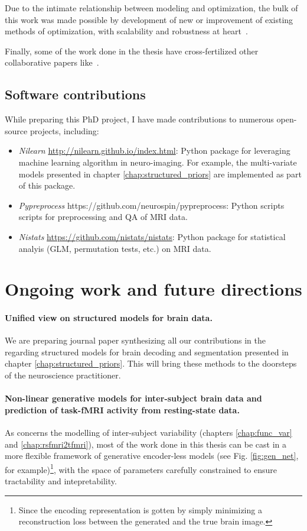 Due to the intimate relationship between modeling and optimization, the
bulk of this work was made possible by development of new or improvement of existing methods of
optimization, with scalability and robustness at heart~\citep{dohmatob2014benchmarking,dohmatob2015local,varoquaux2015faasta,dohmatob2015simple}.

Finally, some of the work done in the thesis have cross-fertilized other collaborative papers like~\citep{rahim2015integrating,thirion2014fmri}.

\subsection{Software contributions}
While preparing this PhD project, I have made contributions to numerous open-source projects, including:
\begin{itemize}
\item \textit{Nilearn} \url{http://nilearn.github.io/index.html}: Python package for leveraging machine learning algorithm in neuro-imaging. For example, the multi-variate models presented in chapter \ref{chap:structured_priors} are implemented as part of this package.
\item \textit{Pypreprocess} https://github.com/neurospin/pypreprocess: Python scripts scripts for preprocessing and QA of MRI data.
\item \textit{Nistats} \url{https://github.com/nistats/nistats}: Python package for statistical analyis (GLM, permutation tests, etc.) on MRI data.
\end{itemize}
    

\section{Ongoing work and future directions}
\paragraph{Unified view on structured models for brain data.}
We are preparing journal paper synthesizing all our contributions in the regarding structured models for brain decoding and segmentation presented in chapter \ref{chap:structured_priors}. This will bring these methods to the doorsteps of the neuroscience practitioner.
\paragraph{Non-linear generative models for inter-subject brain data and prediction of task-fMRI activity from resting-state data.}
As concerns the modelling of inter-subject variability (chapters \ref{chap:func_var} and \ref{chap:rsfmri2tfmri}), most of the work done in this thesis can be cast in a more flexible framework of generative encoder-less models (see Fig. \ref{fig:gen_net}, for example)\footnote{Since the encoding representation is gotten by simply minimizing a reconstruction loss between the generated and the true brain image.}, with the space of parameters carefully constrained to ensure tractability and intepretability.
  
